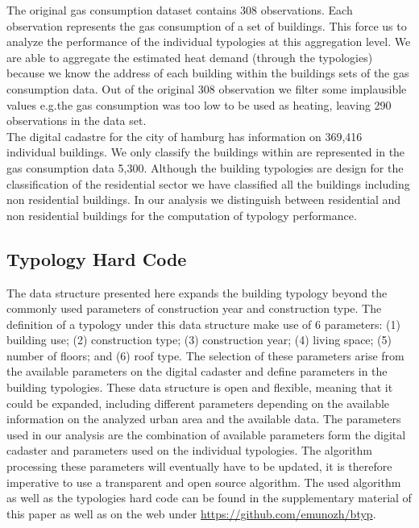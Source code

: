 The original gas consumption dataset contains 308 observations. Each
observation represents the gas consumption of a set of buildings. This force us
to analyze the performance of the individual typologies at this aggregation
level. We are able to aggregate the estimated heat demand (through the
typologies) because we know the address of each building within the buildings
sets of the gas consumption data. Out of the original 308 observation we
filter some implausible values e.g.\@ the gas consumption was too low to be used
as heating, leaving 290 observations in the data set.\\

The digital cadastre for the city of hamburg has information on 369,416
individual buildings. We only classify the buildings within are represented in
the gas consumption data 5,300. Although the building typologies are design for
the classification of the residential sector we have classified all the buildings
including non residential buildings. In our analysis we distinguish between
residential and non residential buildings for the computation of typology
performance.\\

\subsection{Typology Hard Code}\label{sub-sec:hcode}

The data structure presented here expands the building typology beyond the
commonly used parameters of construction year and construction type. The
definition of a typology under this data structure make use of 6 parameters:
(1) building use;
(2) construction type;
(3) construction year;
(4) living space;
(5) number of floors; and
(6) roof type.
The selection of these parameters arise from the available parameters on the
digital cadaster and define parameters in the building typologies. These data
structure is open and flexible, meaning that it could be expanded, including
different parameters depending on the available information on the analyzed
urban area and the available data. The parameters used in our analysis are the
combination of available parameters form the digital cadaster and parameters
used on the individual typologies. The algorithm processing these parameters
will eventually have to be updated, it is therefore imperative to use a
transparent and open source algorithm. The used algorithm as well as the
typologies hard code can be found in the supplementary material of this paper
as well as on the web under \url{https://github.com/emunozh/btyp}.\\

